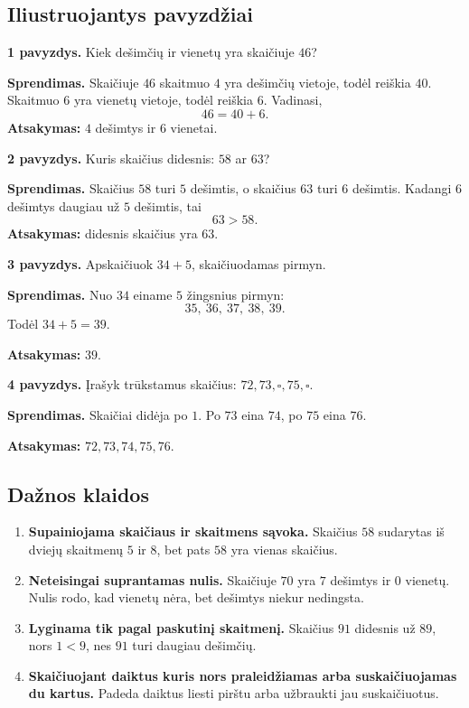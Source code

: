 \subsection{Iliustruojantys pavyzdžiai}

\textbf{1 pavyzdys.} Kiek dešimčių ir vienetų yra skaičiuje \(46\)?

\textbf{Sprendimas.} Skaičiuje \(46\) skaitmuo \(4\) yra dešimčių vietoje, todėl reiškia \(40\). Skaitmuo \(6\) yra vienetų vietoje, todėl reiškia \(6\). Vadinasi,
\[
46=40+6.
\]
\textbf{Atsakymas:} \(4\) dešimtys ir \(6\) vienetai.

\textbf{2 pavyzdys.} Kuris skaičius didesnis: \(58\) ar \(63\)?

\textbf{Sprendimas.} Skaičius \(58\) turi \(5\) dešimtis, o skaičius \(63\) turi \(6\) dešimtis. Kadangi \(6\) dešimtys daugiau už \(5\) dešimtis, tai
\[
63>58.
\]
\textbf{Atsakymas:} didesnis skaičius yra \(63\).

\textbf{3 pavyzdys.} Apskaičiuok \(34+5\), skaičiuodamas pirmyn.

\textbf{Sprendimas.} Nuo \(34\) einame \(5\) žingsnius pirmyn:
\[
35,\ 36,\ 37,\ 38,\ 39.
\]
Todėl \(34+5=39\).

\textbf{Atsakymas:} \(39\).

\textbf{4 pavyzdys.} Įrašyk trūkstamus skaičius: \(72, 73, \square, 75, \square\).

\textbf{Sprendimas.} Skaičiai didėja po \(1\). Po \(73\) eina \(74\), po \(75\) eina \(76\).

\textbf{Atsakymas:} \(72,73,74,75,76\).

\subsection{Dažnos klaidos}

\begin{enumerate}
\item \textbf{Supainiojama skaičiaus ir skaitmens sąvoka.} Skaičius \(58\) sudarytas iš dviejų skaitmenų \(5\) ir \(8\), bet pats \(58\) yra vienas skaičius.
\item \textbf{Neteisingai suprantamas nulis.} Skaičiuje \(70\) yra \(7\) dešimtys ir \(0\) vienetų. Nulis rodo, kad vienetų nėra, bet dešimtys niekur nedingsta.
\item \textbf{Lyginama tik pagal paskutinį skaitmenį.} Skaičius \(91\) didesnis už \(89\), nors \(1<9\), nes \(91\) turi daugiau dešimčių.
\item \textbf{Skaičiuojant daiktus kuris nors praleidžiamas arba suskaičiuojamas du kartus.} Padeda daiktus liesti pirštu arba užbraukti jau suskaičiuotus.
\end{enumerate}


